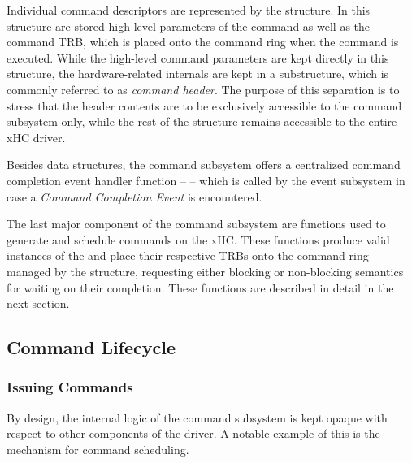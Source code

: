 Individual command descriptors are represented by the 
structure. In this structure are stored high-level parameters of the command as well as
the command TRB, which is placed onto the command ring when the command is
executed. While the high-level command parameters are kept directly in this
structure, the hardware-related internals are kept in a substructure, which is
commonly referred to as \textit{command header}. The purpose of this separation
is to stress that the header contents are to be exclusively accessible to the
command subsystem only, while the rest of the structure remains accessible to
the entire xHC driver.

Besides data structures, the command subsystem offers a centralized command
completion event handler function --  --
which is called by the event subsystem in case a \textit{Command Completion
Event} is encountered.

The last major component of the command subsystem are functions used to generate
and schedule commands on the xHC. These functions produce valid instances of the
 and place their respective TRBs onto the command ring
managed by the  structure, requesting either blocking or
non-blocking semantics for waiting on their completion. These functions are
described in detail in the next section.


\subsection{Command Lifecycle}

\subsubsection{Issuing Commands}

By design, the internal logic of the command subsystem is kept opaque with
respect to other components of the driver. A notable example of this is the
mechanism for command scheduling.

